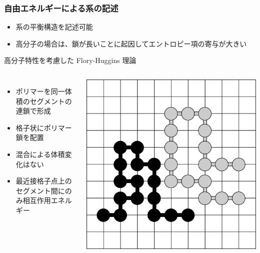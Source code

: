 \documentclass[12pt, dvipdfmx]{beamer}
\begin{document}
\begin{frame}\frametitle{自由エネルギーによる系の記述}
	\begin{itemize}
		\item 系の\alert{平衡構造}を記述可能
		\item \alert{高分子の場合は、鎖が長いことに起因してエントロピー項の寄与が大きい}
	\end{itemize}

	\begin{block}{高分子特性を考慮した Flory-Huggins 理論}
		\begin{columns}[c, onlytextwidth]
			\begin{itemize}
				\item ポリマーを同一体積のセグメントの連鎖で形成
				\item 格子状にポリマー鎖を配置
				\item 混合による体積変化はない
				\item 最近接格子点上のセグメント間にのみ相互作用エネルギー
			\end{itemize}
					\centering
						\includegraphics[width=\textwidth]{FH_model.png}
				
		\end{columns}
	\end{block}
	
\end{frame}
\end{document}
